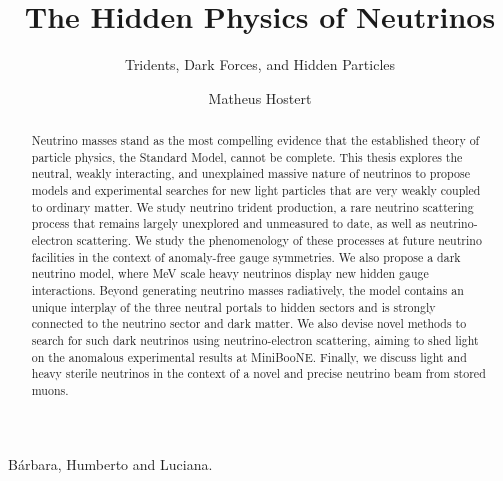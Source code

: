 \documentclass[openany,twoside,frontopenright,chaprunninghead]{ip3thesis}
\begin{document}
\title{The Hidden Physics of Neutrinos}
\subtitle{Tridents, Dark Forces, and Hidden Particles}
\author{Matheus Hostert}
\maketitlepage*

\begin{abstract}
%
Neutrino masses stand as the most compelling evidence that the established theory of particle physics, the Standard Model, cannot be complete. This thesis explores the neutral, weakly interacting, and unexplained massive nature of neutrinos to propose models and experimental searches for new light particles that are very weakly coupled to ordinary matter. We study neutrino trident production, a rare neutrino scattering process that remains largely unexplored and unmeasured to date, as well as neutrino-electron scattering. We study the phenomenology of these processes at future neutrino facilities in the context of anomaly-free gauge symmetries. We also propose a dark neutrino model, where MeV scale heavy neutrinos display new hidden gauge interactions. Beyond generating neutrino masses radiatively, the model contains an unique interplay of the three neutral portals to hidden sectors and is strongly connected to the neutrino sector and dark matter. We also devise novel methods to search for such dark neutrinos using neutrino-electron scattering, aiming to shed light on the anomalous experimental results at MiniBooNE. Finally, we discuss light and heavy sterile neutrinos in the context of a novel and precise neutrino beam from stored muons.
%
\end{abstract}


\begin{dedication*}
%
B\'arbara, Humberto and Luciana.
%
\end{dedication*}

\disableprotrusion
\tableofcontents*
\listoffigures
\enableprotrusion
\end{document}
